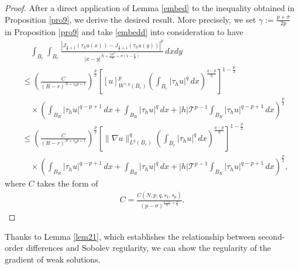 \documentclass[reqno,10pt]{amsart}
\numberwithin{equation}{section}
\begin{document}
\begin{proof}
	After a direct application of Lemma \ref{embed} to the inequality obtained in Proposition \ref{pro9}, we derive the desired result. More precisely, we set $\gamma:=\frac{p+\sigma}{2p}$ in Proposition \ref{pro9} and take \eqref{embedd} into consideration to have
	\begin{align*}
		&\quad\int_{B_r}\int_{B_r}\frac{\left| J_{\frac{q}{p}+1}\left( \tau_hu(x)\right)-J_{\frac{q}{p}+1}\left( \tau_hu(y)\right) \right|^p }{|x-y|^{N+\frac{s_pp^2}{2}+\sigma\left( 1-\frac{p}{2}\right) }}\,dxdy\\
		&\le \left( \frac{C}{(R-r)^{N+s_pp+1}}\right)^\frac{p}{2}\left[ [u]^p_{W^{\gamma,q}(B_r)}\left( \int_{B_r}|\tau_hu|^q\,dx\right)^\frac{q-p}{q} \right]^{1-\frac{p}{2}}\\
		&\quad\times\left(\int_{B_R}|\tau_hu|^{q-p+1}\,dx+\int_{B_R}|\tau_hu|^q\,dx+|h|\mathcal{T}^{p-1}\int_{B_R}|\tau_hu|^{q-p+1}\,dx\right) ^\frac{p}{2}\\
		&\le \left( \frac{C}{(R-r)^{N+s_pp+1}}\right)^\frac{p}{2}\left[\|\nabla u\|^q_{L^q(B_r)}\left( \int_{B_r}|\tau_hu|^q\,dx\right)^\frac{q-p}{q} \right]^{1-\frac{p}{2}}\\
		&\quad\times\left(\int_{B_R}|\tau_hu|^{q-p+1}\,dx+\int_{B_R}|\tau_hu|^q\,dx+|h|\mathcal{T}^{p-1}\int_{B_R}|\tau_hu|^{q-p+1}\,dx\right) ^\frac{p}{2},
	\end{align*}
	where $C$ takes the form of
	\begin{align*}
		C=\frac{C(N,p,q,s_1,s_p)}{(p-\sigma)^{\frac{q-p}{q}+\frac{p}{2}}}.
	\end{align*}
\end{proof}

Thanks to Lemma \ref{lem21}, which establishes the relationship between second-order differences and Sobolev regularity, we can show the regularity of the gradient of weak solutions.
\end{document}
